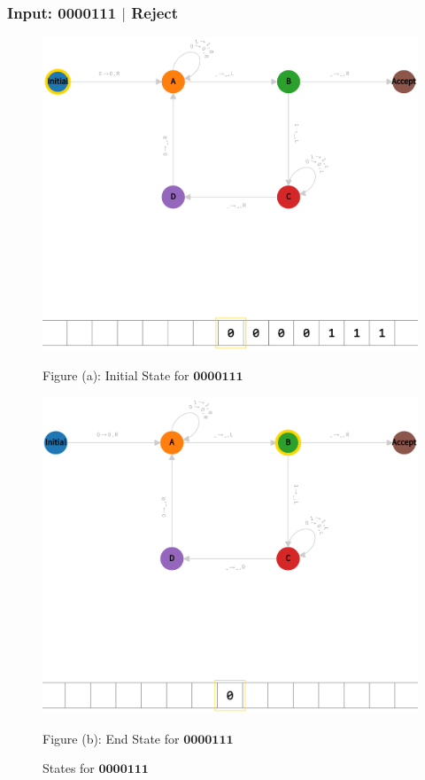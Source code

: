 \subsubsection*{Input: 0000111 $|$ Reject}
\label{q1-0000111}

\begin{figure}[ht]
  \centering
  \begin{minipage}{.49\linewidth}
    \centering
    \includegraphics[width=\linewidth]{answers/img/q1-0000111-initial.png}
    \caption*{Figure (a): Initial State for $\mathbf{0000111}$}
    \label{fig:0000111-initial}
  \end{minipage}
  \begin{minipage}{.49\linewidth}
    \centering
    \includegraphics[width=\linewidth]{answers/img/q1-0000111-end.png}
    \caption*{Figure (b): End State for $\mathbf{0000111}$}
    \label{fig:0000111-end}
  \end{minipage}
  \caption{States for $\mathbf{0000111}$}
  \label{fig:in-0000111}
\end{figure}

